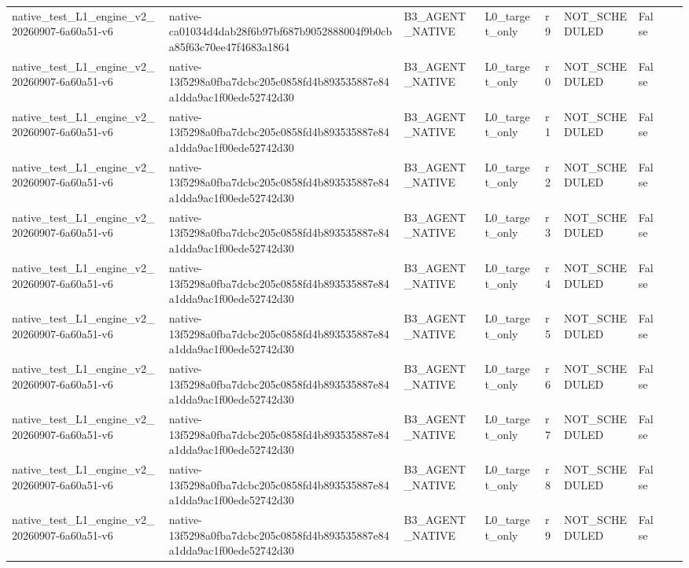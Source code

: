 \begin{tabular}{lllllllll}
native\_test\_L1\_engine\_v2\_20260907-6a60a51-v6 & native-ca01034d4dab28f6b97bf687b9052888004f9b0cba85f63c70ee47f4683a1864 & B3\_AGENT\_NATIVE & L0\_target\_only & r9 & NOT\_SCHEDULED & False &  &  \\
native\_test\_L1\_engine\_v2\_20260907-6a60a51-v6 & native-13f5298a0fba7dcbc205c0858fd4b893535887e84a1dda9ac1f00ede52742d30 & B3\_AGENT\_NATIVE & L0\_target\_only & r0 & NOT\_SCHEDULED & False &  &  \\
native\_test\_L1\_engine\_v2\_20260907-6a60a51-v6 & native-13f5298a0fba7dcbc205c0858fd4b893535887e84a1dda9ac1f00ede52742d30 & B3\_AGENT\_NATIVE & L0\_target\_only & r1 & NOT\_SCHEDULED & False &  &  \\
native\_test\_L1\_engine\_v2\_20260907-6a60a51-v6 & native-13f5298a0fba7dcbc205c0858fd4b893535887e84a1dda9ac1f00ede52742d30 & B3\_AGENT\_NATIVE & L0\_target\_only & r2 & NOT\_SCHEDULED & False &  &  \\
native\_test\_L1\_engine\_v2\_20260907-6a60a51-v6 & native-13f5298a0fba7dcbc205c0858fd4b893535887e84a1dda9ac1f00ede52742d30 & B3\_AGENT\_NATIVE & L0\_target\_only & r3 & NOT\_SCHEDULED & False &  &  \\
native\_test\_L1\_engine\_v2\_20260907-6a60a51-v6 & native-13f5298a0fba7dcbc205c0858fd4b893535887e84a1dda9ac1f00ede52742d30 & B3\_AGENT\_NATIVE & L0\_target\_only & r4 & NOT\_SCHEDULED & False &  &  \\
native\_test\_L1\_engine\_v2\_20260907-6a60a51-v6 & native-13f5298a0fba7dcbc205c0858fd4b893535887e84a1dda9ac1f00ede52742d30 & B3\_AGENT\_NATIVE & L0\_target\_only & r5 & NOT\_SCHEDULED & False &  &  \\
native\_test\_L1\_engine\_v2\_20260907-6a60a51-v6 & native-13f5298a0fba7dcbc205c0858fd4b893535887e84a1dda9ac1f00ede52742d30 & B3\_AGENT\_NATIVE & L0\_target\_only & r6 & NOT\_SCHEDULED & False &  &  \\
native\_test\_L1\_engine\_v2\_20260907-6a60a51-v6 & native-13f5298a0fba7dcbc205c0858fd4b893535887e84a1dda9ac1f00ede52742d30 & B3\_AGENT\_NATIVE & L0\_target\_only & r7 & NOT\_SCHEDULED & False &  &  \\
native\_test\_L1\_engine\_v2\_20260907-6a60a51-v6 & native-13f5298a0fba7dcbc205c0858fd4b893535887e84a1dda9ac1f00ede52742d30 & B3\_AGENT\_NATIVE & L0\_target\_only & r8 & NOT\_SCHEDULED & False &  &  \\
native\_test\_L1\_engine\_v2\_20260907-6a60a51-v6 & native-13f5298a0fba7dcbc205c0858fd4b893535887e84a1dda9ac1f00ede52742d30 & B3\_AGENT\_NATIVE & L0\_target\_only & r9 & NOT\_SCHEDULED & False &  &  \\

\end{tabular}
